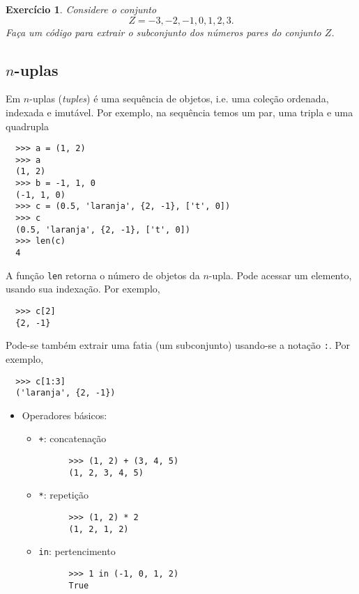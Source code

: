 \documentclass[12pt]{article}
\newtheorem{exr}{Exercício}[section]
\begin{document}
\begin{exr}
  Considere o conjunto
  \begin{equation}
    Z = {-3, -2, -1, 0, 1, 2, 3}.
  \end{equation}
  Faça um código {\python} para extrair o subconjunto dos números pares do conjunto $Z$.
\end{exr}

\subsection{$n$-uplas}

Em {\python} $n$-uplas ({\it tuples}) é uma sequência de objetos, i.e. uma coleção ordenada, indexada e imutável. Por exemplo, na sequência temos um par, uma tripla e uma quadrupla
\begin{lstlisting}
  >>> a = (1, 2)
  >>> a
  (1, 2)
  >>> b = -1, 1, 0
  (-1, 1, 0)
  >>> c = (0.5, 'laranja', {2, -1}, ['t', 0])
  >>> c
  (0.5, 'laranja', {2, -1}, ['t', 0])
  >>> len(c)
  4
\end{lstlisting}
A função \lstinline+len+ retorna o número de objetos da $n$-upla. Pode acessar um elemento, usando sua indexação. Por exemplo,
\begin{lstlisting}
  >>> c[2]
  {2, -1}
\end{lstlisting}
Pode-se também extrair uma fatia (um subconjunto) usando-se a notação \lstinline+:+. Por exemplo,
\begin{lstlisting}
  >>> c[1:3]
  ('laranja', {2, -1})
\end{lstlisting}

\begin{itemize}
\item Operadores básicos:
  \begin{itemize}
  \item[] \lstinline-+-: concatenação
    \begin{lstlisting}
      >>> (1, 2) + (3, 4, 5)
      (1, 2, 3, 4, 5)
    \end{lstlisting}
  \item[] \lstinline+*+: repetição
    \begin{lstlisting}
      >>> (1, 2) * 2
      (1, 2, 1, 2)
    \end{lstlisting}
  \item[] \lstinline+in+: pertencimento
    \begin{lstlisting}
      >>> 1 in (-1, 0, 1, 2)
      True
    \end{lstlisting}
  \end{itemize}
\end{itemize}
\end{document}
